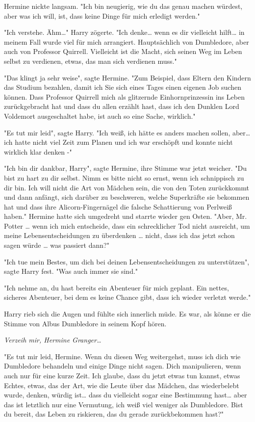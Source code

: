 {Hermine nickte langsam. "Ich bin neugierig, wie du das genau machen würdest, aber was ich will, ist, dass keine Dinge für mich erledigt werden."

"Ich verstehe. Ähm…" Harry zögerte. "Ich denke… wenn es dir vielleicht hilft… in meinem Fall wurde viel für mich arrangiert. Hauptsächlich von Dumbledore, aber auch von Professor Quirrell. Vielleicht ist die Macht, sich seinen Weg im Leben selbst zu verdienen, etwas, das man sich verdienen muss."

"Das klingt ja sehr weise", sagte Hermine. "Zum Beispiel, dass Eltern den Kindern das Studium bezahlen, damit ich Sie sich eines Tages einen eigenen Job suchen können. Dass Professor Quirrell mich als glitzernde Einhornprinzessin ins Leben zurückgebracht hat und dass du allen erzählt hast, dass ich den Dunklen Lord Voldemort ausgeschaltet habe, ist auch so eine Sache, wirklich."

"Es tut mir leid", sagte Harry. "Ich weiß, ich hätte es anders machen sollen, aber… ich hatte nicht viel Zeit zum Planen und ich war erschöpft und konnte nicht wirklich klar denken -"

"Ich bin dir dankbar, Harry", sagte Hermine, ihre Stimme war jetzt weicher. "Du bist zu hart zu dir selbst. Nimm es bitte nicht so ernst, wenn ich schnippisch zu dir bin. Ich will nicht die Art von Mädchen sein, die von den Toten zurückkommt und dann anfängt, sich darüber zu beschweren, welche Superkräfte sie bekommen hat und dass ihre Alicorn-Fingernägel die falsche Schattierung von Perlweiß haben." Hermine hatte sich umgedreht und starrte wieder gen Osten. "Aber, Mr. Potter … wenn ich mich entscheide, dass ein schrecklicher Tod nicht ausreicht, um meine Lebensentscheidungen zu überdenken … nicht, dass ich das jetzt schon sagen würde … was passiert dann?"

"Ich tue mein Bestes, um dich bei deinen Lebensentscheidungen zu unterstützen", sagte Harry fest. "Was auch immer sie sind."

"Ich nehme an, du hast bereits ein Abenteuer für mich geplant. Ein nettes, sicheres Abenteuer, bei dem es keine Chance gibt, dass ich wieder verletzt werde."

Harry rieb sich die Augen und fühlte sich innerlich müde. Es war, als könne er die Stimme von Albus Dumbledore in seinem Kopf hören.

\emph{Verzeih mir, Hermine Granger…}

"Es tut mir leid, Hermine. Wenn du diesen Weg weitergehst, muss ich dich wie Dumbledore behandeln und einige Dinge nicht sagen. Dich manipulieren, wenn auch nur für eine kurze Zeit. Ich glaube, dass du jetzt etwas tun kannst, etwas Echtes, etwas, das der Art, wie die Leute über das Mädchen, das wiederbelebt wurde, denken, würdig ist… dass du vielleicht sogar eine Bestimmung hast… aber das ist letztlich nur eine Vermutung, ich weiß viel weniger als Dumbledore. Bist du bereit, das Leben zu riskieren, das du gerade zurückbekommen hast?"

}
